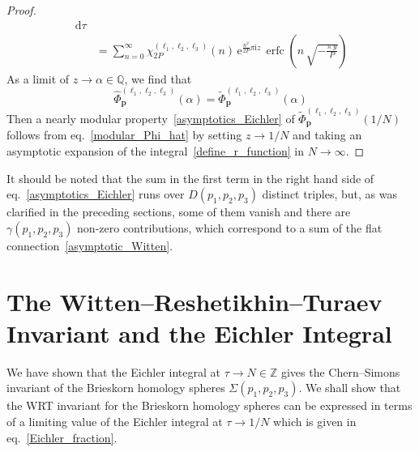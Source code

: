 \documentclass[12pt,reqno]{amsart}
\numberwithin{equation}{section}
\DeclareMathOperator{\erfc}{erfc}
\begin{document}
\begin{proof}
\begin{align*}
{    } \,
    \mathrm{d} \tau
    \\
    & =
    \sum_{n=0}^{\infty}
    \chi_{2 P}^{(\ell_1 , \ell_2 ,\ell_3)}(n) \,
    \mathrm{e}^{
      \frac{n^2}{2 P} \pi \mathrm{i} z
    } \,
    \erfc
    \left(
      n \,
      \sqrt{
        -\frac{\pi \, y}{P}
      }
    \right)
  \end{align*}
  As a limit of $z \to \alpha \in \mathbb{Q}$, we find that
  \begin{equation}
    \widehat{\Phi}_{\boldsymbol{p}}^{(\ell_1 , \ell_2, \ell_3)}(\alpha)
    =
    \widetilde{\Phi}_{\boldsymbol{p}}^{(\ell_1 , \ell_2, \ell_3)}(\alpha)
  \end{equation}
  Then a nearly modular property~\eqref{asymptotics_Eichler} of
  $ \widetilde{\Phi}_{\boldsymbol{p}}^{(\ell_1 , \ell_2, \ell_3)}(1/N)$
  follows from eq.~\eqref{modular_Phi_hat} by setting $z \to 1/N$ and
  taking an asymptotic expansion of the
  integral~\eqref{define_r_function} in $N\to\infty$.
\end{proof}

It should be noted that
the sum
in  the first
term in the right hand side of eq.~\eqref{asymptotics_Eichler}
runs over $D(p_1,p_2,p_3)$ distinct triples, but, as was clarified in
the preceding sections,
some of them vanish and
there are   $\gamma(p_1,p_2,p_3)$ non-zero contributions,
which correspond to a sum of the flat connection~\eqref{asymptotic_Witten}.



\section{The Witten--Reshetikhin--Turaev Invariant and the Eichler Integral}
\label{sec:WRT}

We have shown that the Eichler integral at $\tau\to N \in \mathbb{Z}$ gives the Chern--Simons
invariant of the Brieskorn homology spheres
$\Sigma(p_1,p_2,p_3)$.
We shall show that
the WRT invariant for the Brieskorn homology spheres can be expressed in terms of 
a limiting value of the Eichler integral at $\tau\to 1/N$ which 
is given in eq.~\eqref{Eichler_fraction}.
\end{document}
